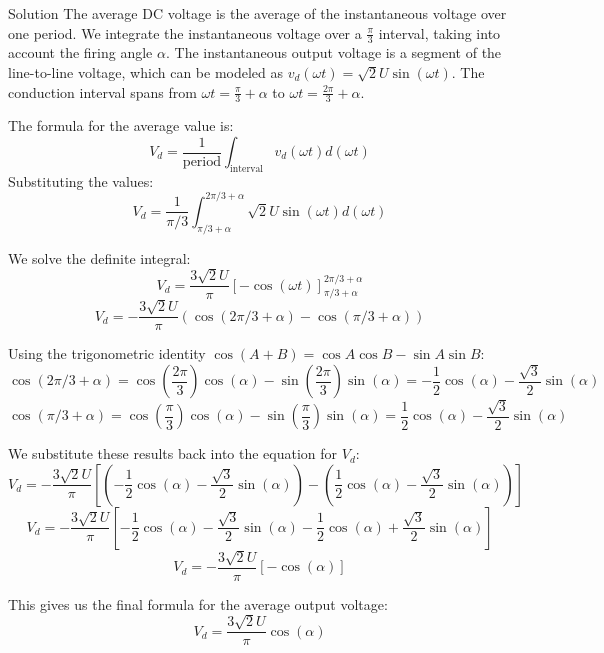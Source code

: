 \begin{frame}[allowframebreaks]{Solution}
The average DC voltage is the average of the instantaneous voltage over one period. 
We integrate the instantaneous voltage over a $\frac{\pi}{3}$ interval, taking into account the firing angle $\alpha$. 
The instantaneous output voltage is a segment of the line-to-line voltage, which can be modeled as $v_{d}(\omega t) = \sqrt{2}U\sin(\omega t)$. 
The conduction interval spans from $\omega t = \frac{\pi}{3} + \alpha$ to $\omega t = \frac{2\pi}{3} + \alpha$.

The formula for the average value is:
$$ V_d = \frac{1}{\text{period}} \int_{\text{interval}} v_d(\omega t) d(\omega t) $$
Substituting the values:
$$ V_d = \frac{1}{\pi/3} \int_{\pi/3 + \alpha}^{2\pi/3 + \alpha} \sqrt{2}U \sin(\omega t) d(\omega t) $$


We solve the definite integral:
$$ V_d = \frac{3\sqrt{2}U}{\pi} \left[ -\cos(\omega t) \right]_{\pi/3 + \alpha}^{2\pi/3 + \alpha} $$
$$ V_d = -\frac{3\sqrt{2}U}{\pi} \left( \cos(2\pi/3 + \alpha) - \cos(\pi/3 + \alpha) \right) $$


Using the trigonometric identity $\cos(A+B) = \cos A \cos B - \sin A \sin B$:
$$ \cos(2\pi/3 + \alpha) = \cos\left(\frac{2\pi}{3}\right)\cos(\alpha) - \sin\left(\frac{2\pi}{3}\right)\sin(\alpha) = -\frac{1}{2}\cos(\alpha) - \frac{\sqrt{3}}{2}\sin(\alpha) $$
$$ \cos(\pi/3 + \alpha) = \cos\left(\frac{\pi}{3}\right)\cos(\alpha) - \sin\left(\frac{\pi}{3}\right)\sin(\alpha) = \frac{1}{2}\cos(\alpha) - \frac{\sqrt{3}}{2}\sin(\alpha) $$


We substitute these results back into the equation for $V_d$:
$$ V_d = -\frac{3\sqrt{2}U}{\pi} \left[ \left(-\frac{1}{2}\cos(\alpha) - \frac{\sqrt{3}}{2}\sin(\alpha)\right) - \left(\frac{1}{2}\cos(\alpha) - \frac{\sqrt{3}}{2}\sin(\alpha)\right) \right] $$
$$ V_d = -\frac{3\sqrt{2}U}{\pi} \left[ -\frac{1}{2}\cos(\alpha) - \frac{\sqrt{3}}{2}\sin(\alpha) - \frac{1}{2}\cos(\alpha) + \frac{\sqrt{3}}{2}\sin(\alpha) \right] $$
$$ V_d = -\frac{3\sqrt{2}U}{\pi} \left[ -\cos(\alpha) \right] $$

This gives us the final formula for the average output voltage:
$$ V_d = \frac{3\sqrt{2}U}{\pi} \cos(\alpha) $$
\end{frame}

